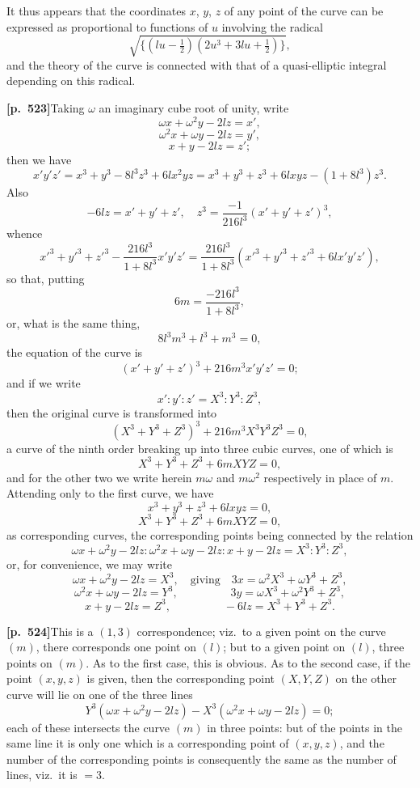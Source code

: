 \documentclass[11pt,a4paper]{article}
\begin{document}
It thus appears that the coordinates $x$, $y$, $z$ of any point of the curve can be expressed as proportional to functions of $u$ involving the radical
\[
\sqrt{\{(lu - \tfrac{1}{2})(2u^{3} + 3lu + \tfrac{1}{2})\}},
\]
and the theory of the curve is connected with that of a quasi-elliptic integral depending on this radical.

\noindent\textbf{[p.~523]}\quad Taking $\omega$ an imaginary cube root of unity, write
\[
\omega x + \omega^{2}y - 2lz = x',
\]
\[
\omega^{2}x + \omega y - 2lz = y',
\]
\[
x + y - 2lz = z';
\]
then we have
\[
x'y'z' = x^{3} + y^{3} - 8l^{3}z^{3} + 6lx^{2}yz = x^{3} + y^{3} + z^{3} + 6lxyz - (1 + 8l^{3})z^{3}.
\]
Also
\[
-6lz = x' + y' + z',\quad z^{3} = \frac{-1}{216l^{3}}(x' + y' + z')^{3},
\]
whence
\[
x'^{3} + y'^{3} + z'^{3} - \frac{216l^{3}}{1 + 8l^{3}}x'y'z' = \frac{216l^{3}}{1 + 8l^{3}}(x'^{3} + y'^{3} + z'^{3} + 6lx'y'z'),
\]
so that, putting
\[
6m = \frac{-216l^{3}}{1 + 8l^{3}},
\]
or, what is the same thing,
\[
8l^{3}m^{3} + l^{3} + m^{3} = 0,
\]
the equation of the curve is
\[
(x' + y' + z')^{3} + 216m^{3}x'y'z' = 0;
\]
and if we write
\[
x' : y' : z' = X^{3} : Y^{3} : Z^{3},
\]
then the original curve is transformed into
\[
(X^{3} + Y^{3} + Z^{3})^{3} + 216m^{3}X^{3}Y^{3}Z^{3} = 0,
\]
a curve of the ninth order breaking up into three cubic curves, one of which is
\[
X^{3} + Y^{3} + Z^{3} + 6mXYZ = 0,
\]
and for the other two we write herein $m\omega$ and $m\omega^{2}$ respectively in place of $m$. Attending only to the first curve, we have
\[
x^{3} + y^{3} + z^{3} + 6lxyz = 0,
\]
\[
X^{3} + Y^{3} + Z^{3} + 6mXYZ = 0,
\]
as corresponding curves, the corresponding points being connected by the relation
\[
\omega x + \omega^{2}y - 2lz : \omega^{2}x + \omega y - 2lz : x + y - 2lz = X^{3} : Y^{3} : Z^{3},
\]
or, for convenience, we may write
\[
\omega x + \omega^{2}y - 2lz = X^{3},\quad \text{giving}\quad 3x = \omega^{2}X^{3} + \omega Y^{3} + Z^{3},
\]
\[
\omega^{2}x + \omega y - 2lz = Y^{3},\quad \phantom{\text{giving}}\quad 3y = \omega X^{3} + \omega^{2}Y^{3} + Z^{3},
\]
\[
x + y - 2lz = Z^{3},\quad \phantom{\text{giving}}\quad -6lz = X^{3} + Y^{3} + Z^{3}.
\]

\noindent\textbf{[p.~524]}\quad This is a $(1, 3)$ correspondence; viz.\ to a given point on the curve $(m)$, there corresponds one point on $(l)$; but to a given point on $(l)$, three points on $(m)$. As to the first case, this is obvious. As to the second case, if the point $(x, y, z)$ is given, then the corresponding point $(X, Y, Z)$ on the other curve will lie on one of the three lines
\[
Y^{3}(\omega x + \omega^{2}y - 2lz) - X^{3}(\omega^{2}x + \omega y - 2lz) = 0;
\]
each of these intersects the curve $(m)$ in three points: but of the points in the same line it is only one which is a corresponding point of $(x, y, z)$, and the number of the corresponding points is consequently the same as the number of lines, viz.\ it is $= 3$.
\end{document}

